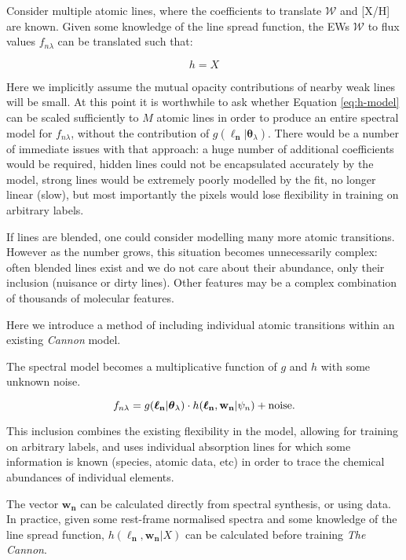 \documentclass[useAMS,usenatbib]{mn2e}
\newcommand\tc{\textit{The Cannon}}
\newcommand\lv{\mathbf{\boldsymbol\ell_n}}
\newcommand\cv{{\boldsymbol\theta}_\lambda}
\newcommand\wv{\mathbf{w_n}}
\newcommand\given{|}
\begin{document}
Consider multiple atomic lines, where the coefficients to translate $\mathcal{W}$ and [X/H] are known. Given some knowledge of the line spread function, the EWs $\mathcal{W}$ to flux values $f_{n\lambda}$ can be translated such that:

\begin{equation}
h = X
\label{eq:h-model}
\end{equation}

Here we implicitly assume the mutual opacity contributions of nearby weak lines will be small. 
At this point it is worthwhile to ask whether Equation \ref{eq:h-model} can be scaled sufficiently to $M$ atomic lines in order to produce an entire spectral model for $f_{n\lambda}$, without the contribution of $g\left(\lv\given\cv\right)$. There would be a number of immediate issues with that approach: a huge number of additional coefficients would be required, hidden lines could not be encapsulated accurately by the model, strong lines would be extremely poorly modelled by the fit, no longer linear (slow), but most importantly the pixels would lose flexibility in training on arbitrary labels. 

If lines are blended, one could consider modelling many more atomic transitions.
However as the number grows, this situation becomes unnecessarily complex:
often blended lines exist and we do not care about their abundance, only their
inclusion (nuisance or dirty lines). Other features may be a complex combination
of thousands of molecular features.

Here we introduce a method of including individual atomic transitions within an existing \textit{Cannon} model.

The spectral model becomes a multiplicative function of $g$ and $h$ with some
unknown noise.

\begin{equation}
    f_{n\lambda} = g(\lv\given\cv) \cdot h(\lv,\wv\given\psi_n) +  {\rm noise}.
\end{equation}

This inclusion combines the existing flexibility in the model, allowing for training on arbitrary labels, and uses individual absorption lines for which some information is known (species, atomic data, etc) in order to trace the chemical abundances of individual elements.


The vector $\wv$ can be calculated directly from spectral synthesis, or using data.
In practice, given some rest-frame normalised spectra and some knowledge of the
line spread function, $h(\lv,\wv\given{}X)$ can be calculated before training \tc.
\end{document}
